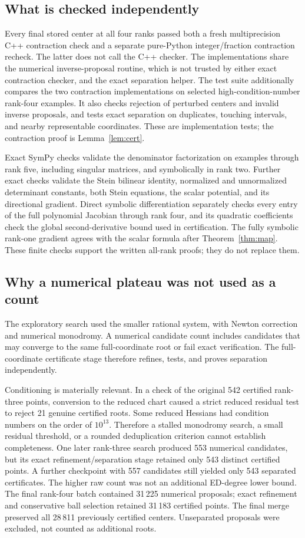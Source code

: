 \documentclass[11pt]{article}
\theoremstyle{remark}\newtheorem{remark}[theorem]{Remark}
\newcommand{\rankfourroots}{31\,183}
\begin{document}
\subsection{What is checked independently}
Every final stored center at all four ranks passed both a fresh multiprecision C++ contraction check and a separate pure-Python integer/fraction contraction recheck. The latter does not call the C++ checker. The implementations share the numerical inverse-proposal routine, which is not trusted by either exact contraction checker, and the exact separation helper. The test suite additionally compares the two contraction implementations on selected high-condition-number rank-four examples. It also checks rejection of perturbed centers and invalid inverse proposals, and tests exact separation on duplicates, touching intervals, and nearby representable coordinates. These are implementation tests; the contraction proof is Lemma~\ref{lem:cert}.

Exact SymPy checks validate the denominator factorization on examples through rank five, including singular matrices, and symbolically in rank two. Further exact checks validate the Stein bilinear identity, normalized and unnormalized determinant constants, both Stein equations, the scalar potential, and its directional gradient. Direct symbolic differentiation separately checks every entry of the full polynomial Jacobian through rank four, and its quadratic coefficients check the global second-derivative bound used in certification. The fully symbolic rank-one gradient agrees with the scalar formula after Theorem~\ref{thm:map}. These finite checks support the written all-rank proofs; they do not replace them.

\subsection{Why a numerical plateau was not used as a count}
The exploratory search used the smaller rational system, with Newton correction and numerical monodromy. A numerical candidate count includes candidates that may converge to the same full-coordinate root or fail exact verification. The full-coordinate certificate stage therefore refines, tests, and proves separation independently.

Conditioning is materially relevant. In a check of the original 542 certified rank-three points, conversion to the reduced chart caused a strict reduced residual test to reject 21 genuine certified roots. Some reduced Hessians had condition numbers on the order of $10^{13}$. Therefore a stalled monodromy search, a small residual threshold, or a rounded deduplication criterion cannot establish completeness. One later rank-three search produced 553 numerical candidates, but its exact refinement/separation stage retained only 543 distinct certified points. A further checkpoint with 557 candidates still yielded only 543 separated certificates. The higher raw count was not an additional ED-degree lower bound. The final rank-four batch contained 31\,225 numerical proposals; exact refinement and conservative ball selection retained \rankfourroots{} certified points. The final merge preserved all 28\,811 previously certified centers. Unseparated proposals were excluded, not counted as additional roots.
\end{document}
